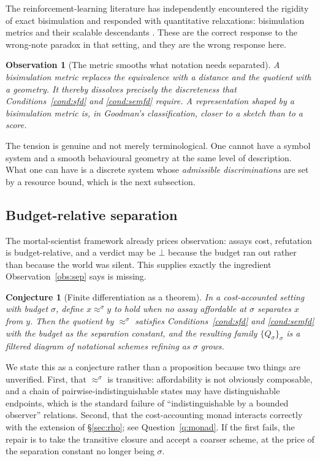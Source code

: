 \documentclass[11pt,a4paper]{article}
\theoremstyle{definition}
\theoremstyle{plain}
\newtheorem{observation}[definition]{Observation}
\newtheorem{conjecture}[definition]{Conjecture}
\theoremstyle{remark}
\newcommand{\bisim}{\approx}
\newcommand{\Qs}{Q_{\sigma}}
\begin{document}
The reinforcement-learning literature has independently encountered the rigidity of exact
bisimulation and responded with quantitative relaxations: bisimulation metrics
\cite{ferns2004} and their scalable descendants \cite{gelada2019,zhang2021,castro2021}.
These are the correct response to the wrong-note paradox in that setting, and they are the
wrong response here.

\begin{observation}[The metric smooths what notation needs separated]
\label{obs:metric}
A bisimulation metric replaces the equivalence with a distance and the quotient with a
geometry. It thereby dissolves precisely the discreteness that
Conditions~\ref{cond:sfd} and \ref{cond:semfd} require. A representation shaped by a
bisimulation metric is, in Goodman's classification, closer to a sketch than to a score.
\end{observation}

\noindent The tension is genuine and not merely terminological. One cannot have a symbol
system and a smooth behavioural geometry at the same level of description. What one can
have is a discrete system whose \emph{admissible discriminations} are set by a resource
bound, which is the next subsection.

\subsection{Budget-relative separation}
\label{sec:budget}

The mortal-scientist framework already prices observation: assays cost, refutation is
budget-relative, and a verdict may be $\bot$ because the budget ran out rather than
because the world was silent. This supplies exactly the ingredient
Observation~\ref{obs:sep} says is missing.

\begin{conjecture}[Finite differentiation as a theorem]
\label{conj:fd}
In a cost-accounted setting with budget $\sigma$, define $x \bisim^{\sigma} y$ to hold
when no assay affordable at $\sigma$ separates $x$ from $y$. Then the quotient by
$\bisim^{\sigma}$ satisfies Conditions~\ref{cond:sfd} and \ref{cond:semfd} with the
budget as the separation constant, and the resulting family
$\{\Qs\}_{\sigma}$ is a filtered diagram of notational schemes refining as
$\sigma$ grows.
\end{conjecture}

\noindent We state this as a conjecture rather than a proposition because two things are
unverified. First, that $\bisim^{\sigma}$ is transitive: affordability is not obviously
composable, and a chain of pairwise-indistinguishable states may have distinguishable
endpoints, which is the standard failure of ``indistinguishable by a bounded observer''
relations. Second, that the cost-accounting monad interacts correctly with the extension
of \S\ref{sec:rho}; see Question~\ref{q:monad}. If the first fails, the repair is to take
the transitive closure and accept a coarser scheme, at the price of the separation
constant no longer being $\sigma$.
\end{document}
